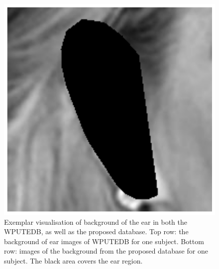\begin{figure}
    \includegraphics[height=\flowh]{resources/Ear_Deformable_Model/verification/background_exp/ear_bg_5}
    \caption{Exemplar visualisation of background of the ear in both the WPUTEDB, as well as the proposed database. Top row: the background of ear images of WPUTEDB for one subject. Bottom row: images of the background from the proposed database for one subject. The black area covers the ear region.}
    \label{fig:bg_exp}
\end{figure}


